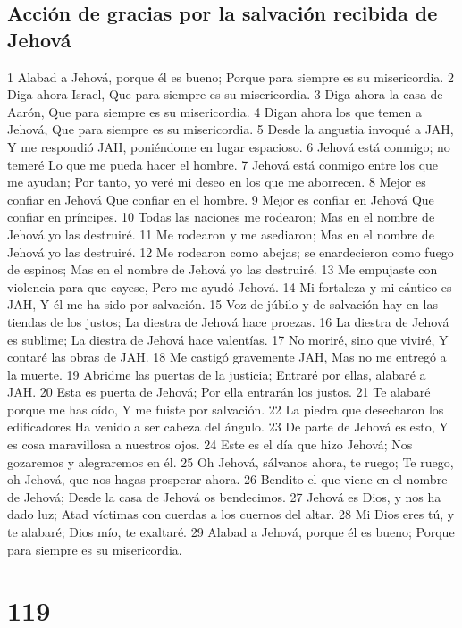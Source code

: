 \section*{Acción de gracias por la salvación recibida de Jehová}

1 Alabad a Jehová, porque él es bueno;
Porque para siempre es su misericordia.
2 Diga ahora Israel,
Que para siempre es su misericordia.
3 Diga ahora la casa de Aarón,
Que para siempre es su misericordia.
4 Digan ahora los que temen a Jehová,
Que para siempre es su misericordia.
5 Desde la angustia invoqué a JAH,
Y me respondió JAH, poniéndome en lugar espacioso.
6 Jehová está conmigo; no temeré
Lo que me pueda hacer el hombre.
7 Jehová está conmigo entre los que me ayudan;
Por tanto, yo veré mi deseo en los que me aborrecen.
8 Mejor es confiar en Jehová
Que confiar en el hombre.
9 Mejor es confiar en Jehová
Que confiar en príncipes.
10 Todas las naciones me rodearon;
Mas en el nombre de Jehová yo las destruiré.
11 Me rodearon y me asediaron;
Mas en el nombre de Jehová yo las destruiré.
12 Me rodearon como abejas; se enardecieron como fuego de espinos;
Mas en el nombre de Jehová yo las destruiré.
13 Me empujaste con violencia para que cayese,
Pero me ayudó Jehová.
14 Mi fortaleza y mi cántico es JAH,
Y él me ha sido por salvación.
15 Voz de júbilo y de salvación hay en las tiendas de los justos;
La diestra de Jehová hace proezas.
16 La diestra de Jehová es sublime;
La diestra de Jehová hace valentías.
17 No moriré, sino que viviré,
Y contaré las obras de JAH.
18 Me castigó gravemente JAH,
Mas no me entregó a la muerte.
19 Abridme las puertas de la justicia;
Entraré por ellas, alabaré a JAH.
20 Esta es puerta de Jehová;
Por ella entrarán los justos.
21 Te alabaré porque me has oído,
Y me fuiste por salvación.
22 La piedra que desecharon los edificadores
Ha venido a ser cabeza del ángulo.
23 De parte de Jehová es esto,
Y es cosa maravillosa a nuestros ojos.
24 Este es el día que hizo Jehová;
Nos gozaremos y alegraremos en él.
25 Oh Jehová, sálvanos  ahora, te ruego;
Te ruego, oh Jehová, que nos hagas prosperar ahora.
26 Bendito el que viene en el nombre de Jehová;
Desde la casa de Jehová os bendecimos.
27 Jehová es Dios, y nos ha dado luz;
Atad víctimas con cuerdas a los cuernos del altar.
28 Mi Dios eres tú, y te alabaré;
Dios mío, te exaltaré.
29 Alabad a Jehová, porque él es bueno;
Porque para siempre es su misericordia.

\chapter{119}

